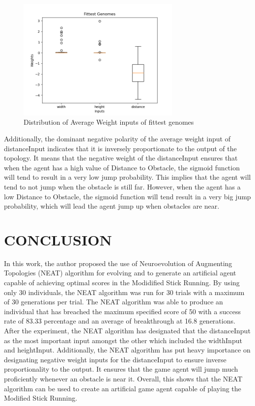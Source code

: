 \documentclass[journal]{IEEEtran}
\begin{document}
\begin{figure}[htbp]
\begin{center}
\includegraphics[width=8cm, height=6cm]{fitPlot.png}
\caption{Distribution of Average Weight inputs of fittest genomes}
\end{center}
\end{figure}

Additionally, the dominant negative polarity of the average weight input of distanceInput indicates that it is inversely proportionate to the output of the topology. It means that the negative weight of the distanceInput ensures that when the agent has a high value of Distance to Obstacle, the sigmoid function will tend to result in a very low jump probability. This implies that the agent will tend to not jump when the obstacle is still far. However, when the agent has a low Distance to Obstacle, the sigmoid function will tend result in a very big jump probability, which will lead the agent
jump up when obstacles are near.

\section{CONCLUSION}
In this work, the author proposed the use of Neuroevolution of Augmenting Topologies (NEAT) algorithm for evolving and to generate an artificial agent capable of achieving optimal scores in the Modidified Stick Running. By using only 30 individuals, the NEAT algorithm was run for 30 trials with a maximum of 30 generations per trial. The NEAT algorithm was able to produce an individual that has breached the maximum specified score of 50 with a success rate of 83.33 percentage and an average of breakthrough at 16.8 generations. After the experiment, the NEAT algorithm has designated that the distanceInput as the most important input amongst the other which included the widthInput and heightInput. Additionally, the NEAT algorithm has put heavy importance on designating negative weight inputs for the distanceInput to ensure inverse proportionality to the output. It ensures that the game agent will jump much proficiently whenever an obstacle is near it. Overall, this shows that the NEAT algorithm can be used to create an artificial game agent capable of playing the Modified Stick Running.
\end{document}

